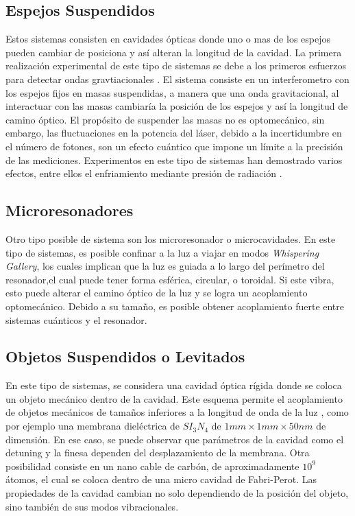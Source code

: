 \documentclass[a4paper,10pt]{report}
\begin{document}
\subsection{Espejos Suspendidos}

Estos sistemas consisten en cavidades ópticas donde uno o mas de los espejos pueden cambiar de posiciona y así alteran la longitud de la cavidad. La primera realización experimental de este tipo de sistemas se debe a los primeros esfuerzos para detectar ondas gravtiacionales \cite{AbramoviciLIGO}. El sistema consiste en un interferometro con los espejos fijos en masas suspendidas, a manera que una onda gravitacional, al interactuar con las masas cambiaría la posición de los espejos y así la longitud de camino óptico. El propósito de suspender las masas no es optomecánico, sin embargo, las fluctuaciones en la potencia del láser, debido a la incertidumbre en el número de fotones, son un efecto cuántico que impone un límite a la precisión de las mediciones\cite{CavesIF}. Experimentos en este tipo de sistemas han demostrado varios efectos, entre ellos el enfriamiento mediante presión de radiación \cite{CorbittOC}.

\subsection{Microresonadores}

Otro tipo posible de sistema son los microresonador o microcavidades. En este tipo de sistemas, es posible confinar a la luz a viajar en modos \textit{Whispering Gallery}, los cuales implican que la luz es guiada a lo largo del perímetro del resonador,el cual puede tener forma esférica, circular, o toroidal\cite{VahalaOM}. Si este vibra, esto puede alterar el camino óptico de la luz y se logra un acoplamiento optomecánico. Debido a su tamaño, es posible obtener acoplamiento fuerte entre sistemas cuánticos y el resonador\cite{VerhagenMOC}.

\subsection{Objetos Suspendidos o Levitados}

En este tipo de sistemas, se considera una cavidad óptica rígida donde se coloca un objeto mecánico dentro de la cavidad. Este esquema permite el acoplamiento de objetos mecánicos de tamaños inferiores a la longitud de onda de la luz \cite{KippenberCO}, como por ejemplo una membrana dieléctrica de $SI_3N_4$ de  $1mm \times 1mm \times 50nm$
de dimensión\cite{SankeyMC}. En ese caso, se puede observar que parámetros de la cavidad como el detuning y la finesa dependen del desplazamiento de la membrana. Otra posibilidad consiste en un nano cable de carbón, de aproximadamente $10^9$ átomos, el cual se coloca dentro de una micro cavidad de Fabri-Perot. Las propiedades de la cavidad cambian no solo dependiendo de la posición del objeto, sino también de sus modos vibracionales\cite{FaveroCR}.  
\end{document}
